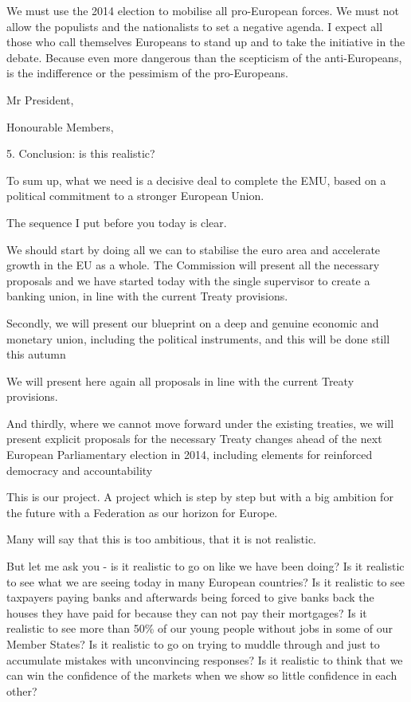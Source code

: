 \documentclass[a4paper,11pt]{article}
\begin{document}
We must use the 2014 election to mobilise all pro-European forces. We must not allow the populists and the nationalists to set a negative agenda. I expect all those who call themselves Europeans to stand up and to take the initiative in the debate. Because even more dangerous than the scepticism of the anti-Europeans, is the indifference or the pessimism of the pro-Europeans.

Mr President,

Honourable Members,

5. Conclusion: is this realistic?

To sum up, what we need is a decisive deal to complete the EMU, based on a political commitment to a stronger European Union.

The sequence I put before you today is clear.

We should start by doing all we can to stabilise the euro area and accelerate growth in the EU as a whole. The Commission will present all the necessary proposals and we have started today with the single supervisor to create a banking union, in line with the current Treaty provisions.

Secondly, we will present our blueprint on a deep and genuine economic and monetary union, including the political instruments, and this will be done still this autumn

We will present here again all proposals in line with the current Treaty provisions.

And thirdly, where we cannot move forward under the existing treaties, we will present explicit proposals for the necessary Treaty changes ahead of the next European Parliamentary election in 2014, including elements for reinforced democracy and accountability

This is our project. A project which is step by step but with a big ambition for the future with a Federation as our horizon for Europe.

Many will say that this is too ambitious, that it is not realistic.

But let me ask you - is it realistic to go on like we have been doing? Is it realistic to see what we are seeing today in many European countries? Is it realistic to see taxpayers paying banks and afterwards being forced to give banks back the houses they have paid for because they can not pay their mortgages? Is it realistic to see more than 50\% of our young people without jobs in some of our Member States? Is it realistic to go on trying to muddle through and just to accumulate mistakes with unconvincing responses? Is it realistic to think that we can win the confidence of the markets when we show so little confidence in each other?
\end{document}
